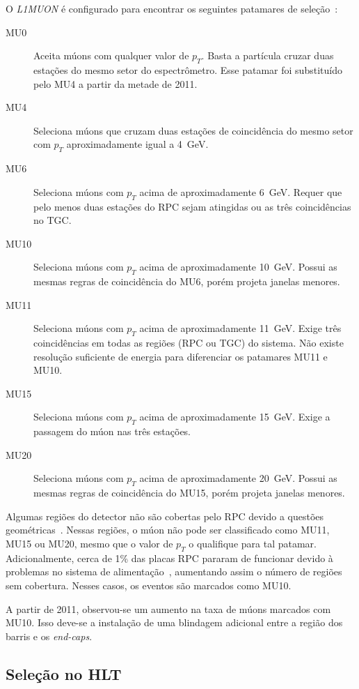 O \emph{L1MUON} é configurado para encontrar os seguintes patamares de
seleção~\cite{BUTTINGER2012}:

\begin{description}
    \item[MU0] Aceita múons com qualquer valor de $p_T$. Basta a partícula
    cruzar duas estações do mesmo setor do espectrômetro. Esse patamar foi
    substituído pelo MU4 a partir da metade de 2011.
    \item[MU4] Seleciona múons que cruzam duas estações de coincidência do mesmo
    setor com $p_T$ aproximadamente igual a 4~GeV.
    \item[MU6] Seleciona múons com $p_T$ acima de aproximadamente 6~GeV. Requer
    que pelo menos duas estações do RPC sejam atingidas ou as três coincidências
    no TGC.
    \item[MU10] Seleciona múons com $p_T$ acima de aproximadamente 10~GeV. Possui
    as mesmas regras de coincidência do MU6, porém projeta janelas menores.
    \item[MU11] Seleciona múons com $p_T$ acima de aproximadamente 11~GeV. Exige
    três coincidências em todas as regiões (RPC ou TGC) do sistema. Não existe
    resolução suficiente de energia para diferenciar os patamares MU11 e MU10.
    \item[MU15] Seleciona múons com $p_T$ acima de aproximadamente 15~GeV. Exige
    a passagem do múon nas três estações.
    \item[MU20] Seleciona múons com $p_T$ acima de aproximadamente 20~GeV. Possui
    as mesmas regras de coincidência do MU15, porém projeta janelas menores.
\end{description}

Algumas regiões do detector não são cobertas pelo RPC devido a questões
geométricas~\cite{MUONTDR1997}. Nessas regiões, o múon não pode ser classificado
como MU11, MU15 ou MU20, mesmo que o valor de $p_T$ o qualifique para tal
patamar. Adicionalmente, cerca de 1\% das placas RPC pararam de funcionar devido
à problemas no sistema de alimentação~\cite{ATLAS-CONF-2012-099}, aumentando
assim o número de regiões sem cobertura. Nesses casos, os eventos são marcados
como MU10.

A partir de 2011, observou-se um aumento na taxa de múons marcados com MU10.
Isso deve-se a instalação de uma blindagem adicional entre a região dos barris e
os \emph{end-caps}.

\subsection{Seleção no HLT}

